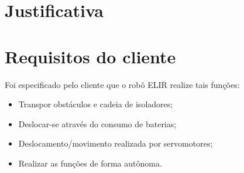\section{Justificativa}
\label{sec:justi}


\section{Requisitos do cliente}
\label{sec:reqc}
Foi especificado pelo cliente que o robô ELIR realize tais funções:

\begin{itemize}
	
	\item Transpor obstáculos e cadeia de isoladores;
	\item Deslocar-se através do consumo de baterias;
	\item Deslocamento/movimento realizada por servomotores;
	\item Realizar as funções de forma autônoma.
	
\end{itemize}



